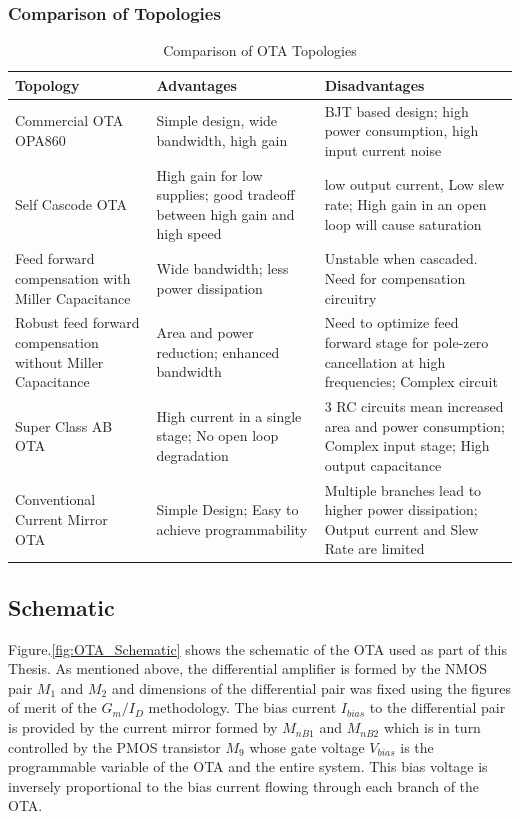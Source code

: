 \subsubsection{Comparison of Topologies}
\begin{table} [H]
\centering
\begin{tabular}{|m{5cm}|m{5cm}|m{5cm}|}
\toprule
Topology				& Advantages				& Disadvantages			\\ \midrule
\hline
Commercial OTA OPA860	& Simple design, wide bandwidth, high gain	& BJT based design; high power consumption, high input current noise \\ \hline
Self Cascode OTA	& High gain for low supplies; good tradeoff between high gain and high speed	& low output current, Low slew rate; High gain in an open loop will cause saturation \\ \hline
Feed forward compensation with Miller Capacitance	& Wide bandwidth; less power dissipation 	& Unstable when cascaded. Need for compensation circuitry \\ \hline
Robust feed forward compensation without Miller Capacitance & Area and power reduction; enhanced bandwidth	& Need to optimize feed forward stage for pole-zero cancellation at high frequencies; Complex circuit \\ \hline
Super Class AB OTA & High current in a single stage; No open loop degradation & 3 RC circuits mean                                                                                                   increased area and power consumption; Complex input stage; High output capacitance \\ \hline
Conventional Current Mirror OTA & Simple Design; Easy to achieve programmability & Multiple branches lead to higher power dissipation; Output current and Slew Rate are limited \\ \hline
\bottomrule
\end{tabular}
\caption{Comparison of OTA Topologies}
\label{tab:OTA_topologies}
\end{table}
\subsection{Schematic}

Figure.\ref{fig:OTA_Schematic} \cite{lcmfb_ota} shows the schematic of the OTA used as part of this Thesis. As mentioned above, the differential amplifier is formed by the NMOS pair $M_{1}$ and $M_{2}$ and dimensions of the differential pair was fixed using the figures of merit of the ${G_m/I_D}$ methodology. The bias current $I_{bias}$ to the differential pair is provided by the current mirror formed by $M_{nB1}$ and $M_{nB2}$ which is in turn controlled by the PMOS transistor $M_9$ whose gate voltage $V_{bias}$ is the programmable variable of the OTA and the entire system. This bias voltage is inversely proportional to the bias current flowing through each branch of the OTA.


